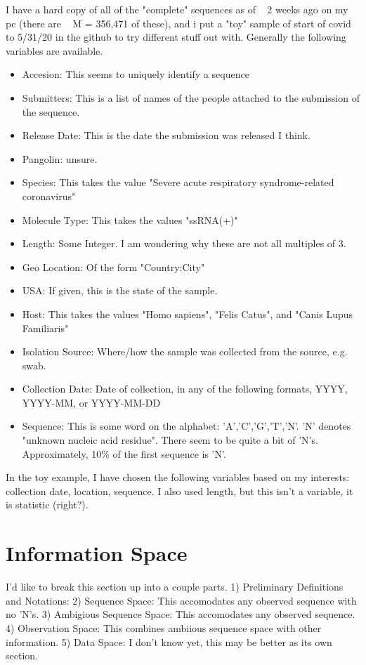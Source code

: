 I have a hard copy of all of the "complete" sequences as of ~ 2 weeks ago on my pc (there are ~ M = 356,471 of these), and i put a "toy" sample of start of covid to 5/31/20 in the github to try different stuff out with. Generally the following variables are available.
\begin{itemize}\item Accesion: This seems to uniquely identify a sequence
\item Submitters: This is a list of names of the people attached to the submission of the sequence.
\item Release Date: This is the date the submission was released I think.
\item Pangolin: unsure.
\item Species: This takes the value "Severe acute respiratory syndrome-related coronavirus"
\item Molecule Type: This takes the values "ssRNA(+)"
\item Length: Some Integer. I am wondering why these are not all multiples of 3.
\item Geo Location: Of the form "Country:City"
\item USA: If given, this is the state of the sample.
\item Host: This takes the values "Homo sapiens", "Felis Catus", and "Canis Lupus Familiaris"
\item Isolation Source: Where/how the sample was collected from the source, e.g. swab.
\item Collection Date: Date of collection, in any of the following formats, YYYY, YYYY-MM, or YYYY-MM-DD
\item Sequence: This is some word on the alphabet: 'A','C','G','T','N'. 'N' denotes "unknown nucleic acid residue". There seem to be quite a bit of 'N's. Approximately, 10\% of the first sequence is 'N'.
\end{itemize}

In the toy example, I have chosen the following variables based on my interests: collection date, location, sequence. I also used length, but this isn't a variable, it is statistic (right?).

\section{Information Space}
I'd like to break this section up into a couple parts.
1) Preliminary Definitions and Notations:
2) Sequence Space: This accomodates any observed sequence with no 'N's.
3) Ambigious Sequence Space: This accomodates any observed sequence.
4) Observation Space: This combines ambiious sequence space with other information.
5) Data Space: I don't know yet, this may be better as its own section.

